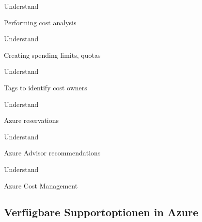 \documentclass{scrartcl}
\newenvironment{flashcard}[2][]{%
    #1
    \vfill
    \centerline{\Large{#2}}
    \vfill
\newpage
}
{\newpage}
\newcommand{\subsectioncard}[1]{
    \vspace*{\stretch{1}}
    \subsection{#1}
    \vspace*{\stretch{1}}
    \pagebreak
}
\begin{document}
    \begin{flashcard}[Understand]{Performing cost analysis}

    \end{flashcard}

    \begin{flashcard}[Understand]{Creating spending limits, quotas}

    \end{flashcard}

    \begin{flashcard}[Understand]{Tags to identify cost owners}

    \end{flashcard}

    \begin{flashcard}[Understand]{Azure reservations}

    \end{flashcard}

    \begin{flashcard}[Understand]{Azure Advisor recommendations}

    \end{flashcard}

    \begin{flashcard}[Understand]{Azure Cost Management}

    \end{flashcard}

    \subsectioncard{Verfügbare Supportoptionen in Azure}
\end{document}
